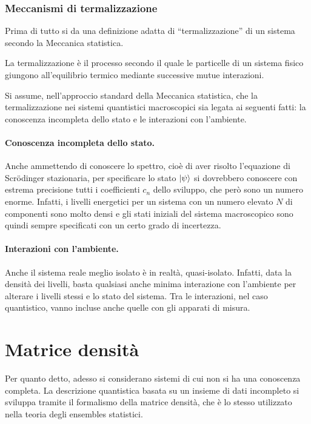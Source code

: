 \subsubsection{Meccanismi di termalizzazione}
Prima di tutto si da una definizione adatta di ``termalizzazione'' di un sistema secondo la Meccanica statistica.
\begin{defn}[termalizzazione]
    La termalizzazione è il processo secondo il quale le particelle di un sistema fisico giungono all'equilibrio termico mediante successive mutue interazioni.
\end{defn}
Si assume, nell'approccio standard della Meccanica statistica, che la termalizzazione nei sistemi quantistici macroscopici sia legata ai seguenti fatti: la conoscenza incompleta dello stato e le interazioni con l'ambiente.

\paragraph{Conoscenza incompleta dello stato.} Anche ammettendo di conoscere lo spettro, cioè di aver risolto l'equazione di Scr\"odinger stazionaria, per specificare lo stato $\ket{\psi}$ si dovrebbero conoscere con estrema precisione tutti i coefficienti $c_n$ dello sviluppo, che però sono un numero enorme. Infatti, i livelli energetici per un sistema con un numero elevato $N$ di componenti sono molto densi e gli stati iniziali del sistema macroscopico sono quindi sempre specificati con un certo grado di incertezza.

\paragraph{Interazioni con l'ambiente.}  Anche il sistema reale meglio isolato è in realtà, quasi-isolato. Infatti, data la densità dei livelli, basta qualsiasi anche minima interazione con l'ambiente per alterare i livelli stessi e lo stato del sistema. Tra le interazioni, nel caso quantistico, vanno incluse anche quelle con gli apparati di misura.

\section{Matrice densità}
Per quanto detto, adesso si considerano sistemi di cui non si ha una conoscenza completa. La descrizione quantistica basata su un insieme di dati incompleto si sviluppa tramite il formalismo della matrice densità, che è lo stesso utilizzato nella teoria degli ensembles statistici. 

